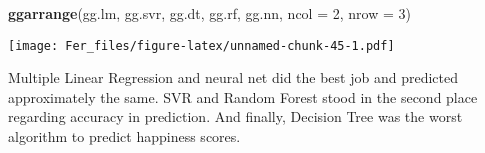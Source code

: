 \documentclass[
]{article}
\newenvironment{Shaded}{\begin{snugshade}}{\end{snugshade}}
\newcommand{\AttributeTok}[1]{\textcolor[rgb]{0.13,0.29,0.53}{#1}}
\newcommand{\DecValTok}[1]{\textcolor[rgb]{0.00,0.00,0.81}{#1}}
\newcommand{\FunctionTok}[1]{\textcolor[rgb]{0.13,0.29,0.53}{\textbf{#1}}}
\newcommand{\NormalTok}[1]{#1}
\begin{document}
\begin{Shaded}
\begin{Highlighting}[]
\FunctionTok{ggarrange}\NormalTok{(gg.lm, gg.svr, gg.dt, gg.rf, gg.nn, }\AttributeTok{ncol =} \DecValTok{2}\NormalTok{, }\AttributeTok{nrow =} \DecValTok{3}\NormalTok{)}
\end{Highlighting}
\end{Shaded}

\texttt{[image: Fer\_files/figure-latex/unnamed-chunk-45-1.pdf]}

Multiple Linear Regression and neural net did the best job and predicted
approximately the same. SVR and Random Forest stood in the second place
regarding accuracy in prediction. And finally, Decision Tree was the
worst algorithm to predict happiness scores.
\end{document}
